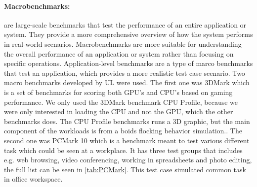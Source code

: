 \paragraph{Macrobenchmarks:} are large-scale benchmarks that test the performance of an entire application or system. They provide a more comprehensive overview of how the system performs in real-world scenarios. Macrobenchmarks are more suitable for understanding the overall performance of an application or system rather than focusing on specific operations.\cite{MicroVSMacro} Application-level benchmarks are a type of marco benchmarks that test an application, which provides a more realistic test case scenario. Two macro benchmarks developed by UL were used. The first one was 3DMark which is a set of benchmarks for scoring both GPU's and CPU's based on gaming performance. We only used the 3DMark benchmark CPU Profile, because we were only interested in loading the CPU and not the GPU, which the other benchmarks does. The CPU Profile benchmarks runs a 3D graphic, but the main component of the workloads is from a boids flocking behavior simulation.\cite{3dmark}. The second one was PCMark 10 which is a benchmark meant to test various different task which could be seen at a workplace. It has three test groups that includes e.g. web browsing, video conferencing, working in spreadsheets and photo editing, the full list can be seen in \cref{tab:PCMark}. This test case simulated common task in office workspace.\cite{pcmark}